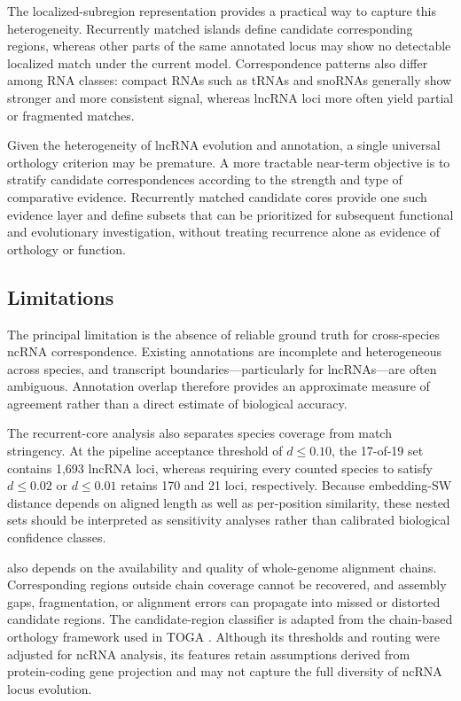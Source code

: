 The localized-subregion representation provides a practical way to capture this
heterogeneity. Recurrently matched islands define candidate corresponding regions,
whereas other parts of the same annotated locus may show no detectable localized
match under the current model. Correspondence patterns also differ among RNA
classes: compact RNAs such as tRNAs and snoRNAs generally show stronger and more
consistent signal, whereas lncRNA loci more often yield partial or fragmented
matches.

Given the heterogeneity of lncRNA evolution and annotation, a single universal
orthology criterion may be premature. A more tractable near-term objective is to
stratify candidate correspondences according to the strength and type of
comparative evidence. Recurrently matched candidate cores provide one such
evidence layer and define subsets that can be prioritized for subsequent
functional and evolutionary investigation, without treating recurrence alone as
evidence of orthology or function.

\subsection{Limitations}

The principal limitation is the absence of reliable ground truth for
cross-species ncRNA correspondence. Existing annotations are incomplete and
heterogeneous across species, and transcript boundaries---particularly for
lncRNAs---are often ambiguous. Annotation overlap therefore provides an
approximate measure of agreement rather than a direct estimate of biological
accuracy.

The recurrent-core analysis also separates species coverage from match
stringency. At the pipeline acceptance threshold of $d\leq0.10$, the 17-of-19
set contains 1{,}693 lncRNA loci, whereas requiring every counted species to
satisfy $d\leq0.02$ or $d\leq0.01$ retains 170 and 21 loci, respectively.
Because embedding-SW distance depends on aligned length as well as per-position
similarity, these nested sets should be interpreted as sensitivity analyses
rather than calibrated biological confidence classes.

\curia{} also depends on the availability and quality of whole-genome alignment
chains. Corresponding regions outside chain coverage cannot be recovered, and
assembly gaps, fragmentation, or alignment errors can propagate into missed or
distorted candidate regions. The candidate-region classifier is adapted from the
chain-based orthology framework used in TOGA
\citep{kirilenkoIntegratingGeneAnnotation2023}. Although its thresholds and
routing were adjusted for ncRNA analysis, its features retain assumptions derived
from protein-coding gene projection and may not capture the full diversity of
ncRNA locus evolution.

